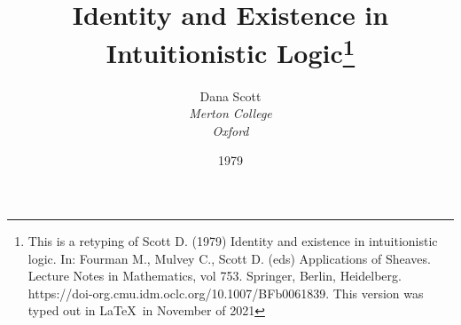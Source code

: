 %
%
%

\usepackage[papersize={6.7in, 10.0in}, left=.5in, right=.5in, top=1in, bottom=.9in]{geometry}
\linespread{1.1}
\raggedbottom
\pagestyle{plain}
\usepackage{mathpartir}
\usepackage{stmaryrd}
\usepackage{mathtools}
\usepackage{tikz-cd}
\usepackage{microtype}
\usepackage{amssymb}




\usepackage[small]{titlesec}
\usepackage{cite}

\setcounter{tocdepth}{3}

\def\to{\rightarrow}
\def\imp{\shortrightarrow}
\def\iff{\leftrightarrow}
\def\union{\cup}
\def\inc{\subseteq}
\def\dom{\mathop{\rm dom}}
\def\cod{\mathop{\rm cod}}
\def\id{{\mathrm 1}}
\def\res{\!\upharpoonleft\!}
\def\ffam{\varphi}
\def\comp{\circ}
\def\bbone{\mathbb 1}
\def\zeromap{0}
\def\bbzero{{\mathbb O}}
\def\ccc{{c.c.c.}}
\def\ev{\varepsilon}
\def\ebc{\varepsilon_{BC}}
\def\L{\Lambda}
\def\l{\lambda}
\def\lm#1.#2{\lambda#1.\, #2}
\def\br#1{[\, #1 \, ]}
\def\V{V}
\def\U{U}
\def\D{D}
\def\C{\mathcal C}
\def\S{\mathcal S}
\def\lxy{\l x\, \l y . \,}
\def\lmm#1#2.#3{\l #1\, \l #2 . \, #3}
\def\sss{(*\!*\!*)}
\def\ss{(**)}
\def\ssn{(**_n)}
\def\scop{\S^{\C^{op}}}
\def\PU{\mathcal P U}
\def\P{\mathcal P}
\def\UU{(U\to U)}
\def\BA{B \to A}
\def\AB{A \to B}

\def\beq{\begin{equation}}
\def\eeq{\end{equation}}
\def\beqq{\begin{equation*}}
\def\eeqq{\end{equation*}}

\makeatletter
\newcommand*\dotop{\mathpalette\bigcdot@{.6}}
\newcommand*\bigcdot@[2]{\mathbin{\vcenter{\hbox{\scalebox{#2}{$\m@th#1\bullet$}}}}}
\makeatother

\title{\large Identity and Existence in Intuitionistic Logic\footnote{This is a retyping of Scott D. (1979) Identity and existence in intuitionistic logic. In: Fourman M., Mulvey C., Scott D. (eds) Applications of Sheaves. Lecture Notes in Mathematics, vol 753. Springer, Berlin, Heidelberg. https://doi-org.cmu.idm.oclc.org/10.1007/BFb0061839. This version was typed out in \LaTeX\ in November of 2021}
}
\author{\normalsize Dana Scott \\
{\small\it Merton College}\\
{\small\it Oxford}}
\date{\small 1979}



